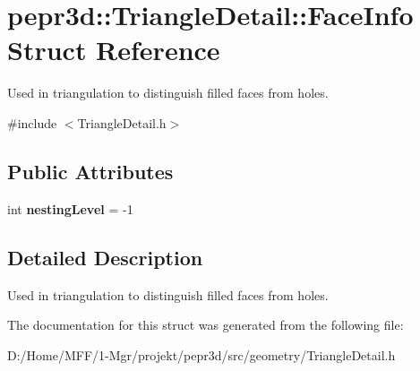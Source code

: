 \hypertarget{structpepr3d_1_1_triangle_detail_1_1_face_info}{}\section{pepr3d\+::Triangle\+Detail\+::Face\+Info Struct Reference}
\label{structpepr3d_1_1_triangle_detail_1_1_face_info}


Used in triangulation to distinguish filled faces from holes.  




{\ttfamily \#include $<$Triangle\+Detail.\+h$>$}

\subsection*{Public Attributes}
\begin{DoxyCompactItemize}
\item 
\mbox{\label{structpepr3d_1_1_triangle_detail_1_1_face_info_a55b54663e3bcbd9cc68b365672ae729c}} 
int {\bfseries nesting\+Level} = -\/1
\end{DoxyCompactItemize}


\subsection{Detailed Description}
Used in triangulation to distinguish filled faces from holes. 

The documentation for this struct was generated from the following file\+:\begin{DoxyCompactItemize}
\item 
D\+:/\+Home/\+M\+F\+F/1-\/\+Mgr/projekt/pepr3d/src/geometry/Triangle\+Detail.\+h\end{DoxyCompactItemize}
